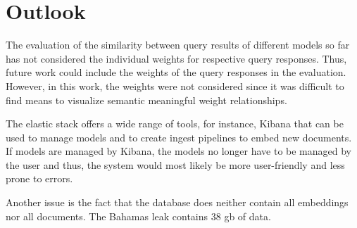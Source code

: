 \section{Outlook}\label{sec:outlook}



The evaluation of the similarity between query results of different models so far has not considered the individual weights for respective query responses.
Thus, future work could include the weights of the query responses in the evaluation.
However, in this work, the weights were not considered since it was difficult to find means to visualize semantic meaningful weight relationships.



The elastic stack offers a wide range of tools, for instance, Kibana that can be used to manage models and 
to create ingest pipelines to embed new documents.
If models are managed by Kibana, the models no longer have to be managed by the user and thus, 
the system would most likely be more user-friendly and less prone to errors.

Another issue is the fact that the database does neither contain all embeddings nor all documents.
The Bahamas leak contains 38 \ac{gb} of data.